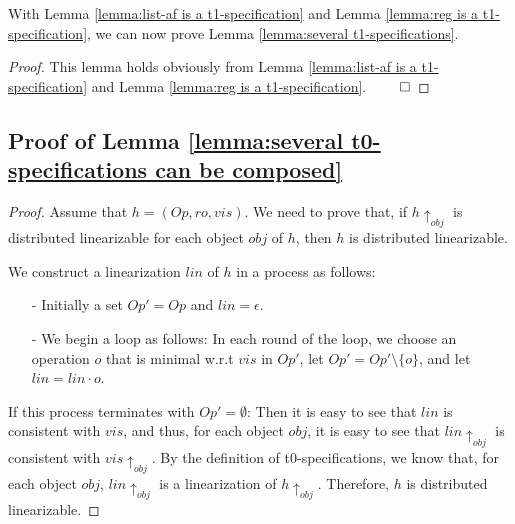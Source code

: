 {With Lemma \ref{lemma:list-af is a t1-specification} and Lemma \ref{lemma:reg is a t1-specification}, we can now prove Lemma \ref{lemma:several t1-specifications}.

\SeveralTOneSpecifications*

\begin {proof}
This lemma holds obviously from Lemma \ref{lemma:list-af is a t1-specification} and Lemma \ref{lemma:reg is a t1-specification}. $\qed$
\end {proof}









\subsection{Proof of Lemma \ref{lemma:several t0-specifications can be composed}}
\label{subsec:appendix proofs of lemma several t0-specifications can be composed}

\composingTZero*
\begin {proof}
Assume that $h = (\mathit{Op},\mathit{ro},\mathit{vis})$. We need to prove that, if $h \uparrow_{\mathit{obj}}$ is distributed linearizable for each object $\mathit{obj}$ of $h$, then $h$ is distributed linearizable.

We construct a linearization $\mathit{lin}$ of $h$ in a process as follows:

\begin{itemize}
\setlength{\itemsep}{0.5pt}
\item[-] Initially a set $\mathit{Op}' = \mathit{Op}$ and $\mathit{lin} = \epsilon$.

\item[-] We begin a loop as follows: In each round of the loop, we choose an operation $o$ that is minimal w.r.t $\mathit{vis}$ in $\mathit{Op}'$, let $\mathit{Op}' = \mathit{Op}' \setminus \{ o \}$, and let $\mathit{lin} = \mathit{lin} \cdot o$.
\end{itemize}

If this process terminates with $\mathit{Op}' = \emptyset$: Then it is easy to see that $\mathit{lin}$ is consistent with $\mathit{vis}$, and thus, for each object $\mathit{obj}$, it is easy to see that $\mathit{lin} \uparrow_{\mathit{obj}}$ is consistent with $\mathit{vis} \uparrow_{\mathit{obj}}$. By the definition of t0-specifications, we know that, for each object $\mathit{obj}$, $\mathit{lin} \uparrow_{\mathit{obj}}$ is a linearization of $h \uparrow_{\mathit{obj}}$. Therefore, $h$ is distributed linearizable.


\end{proof}}
